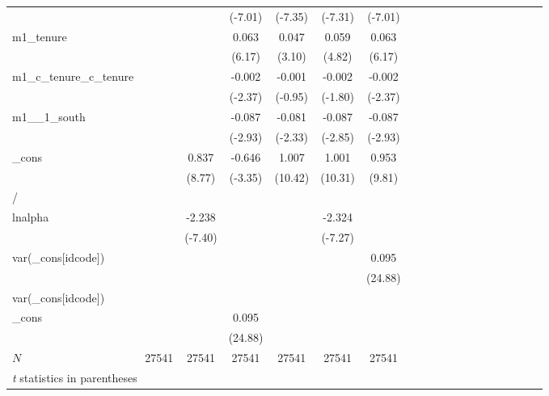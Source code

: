 \documentclass[bib]{statapress}
\begin{document}
\begin{table}[H]
{\begin{tabular}{l*{6}{c}cccccccccccc}
            &            &            &     (-7.01)&     (-7.35)&     (-7.31)&     (-7.01)\\
m1\_tenure   &            &            &       0.063&       0.047&       0.059&       0.063\\
            &            &            &      (6.17)&      (3.10)&      (4.82)&      (6.17)\\
m1\_c\_tenure\_c\_tenure&            &            &      -0.002&      -0.001&      -0.002&      -0.002\\
            &            &            &     (-2.37)&     (-0.95)&     (-1.80)&     (-2.37)\\
m1\_\_1\_south &            &            &      -0.087&      -0.081&      -0.087&      -0.087\\
            &            &            &     (-2.93)&     (-2.33)&     (-2.85)&     (-2.93)\\
\_cons      &            &       0.837&      -0.646&       1.007&       1.001&       0.953\\
            &            &      (8.77)&     (-3.35)&     (10.42)&     (10.31)&      (9.81)\\
\hline
/           &            &            &            &            &            &            \\
lnalpha     &            &      -2.238&            &            &      -2.324&            \\
            &            &     (-7.40)&            &            &     (-7.27)&            \\
var(\_cons[idcode])&            &            &            &            &            &       0.095\\
            &            &            &            &            &            &     (24.88)\\
\hline
var(\_cons[idcode])&            &            &            &            &            &            \\
\_cons      &            &            &       0.095&            &            &            \\
            &            &            &     (24.88)&            &            &            \\
\hline
\(N\)       &       27541&       27541&       27541&       27541&       27541&       27541\\
\hline\hline
\multicolumn{7}{l}{\footnotesize \textit{t} statistics in parentheses}\\
\end{tabular}

}

\end{table}%
\end{document}
